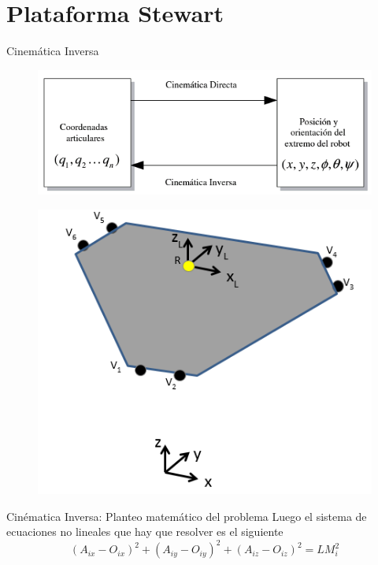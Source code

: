 \documentclass{beamer}
\begin{document}
\section{Plataforma Stewart}
\begin{frame}{Cinemática Inversa}
\begin{figure}[h]
\centering
\includegraphics[scale=0.4]{cinematica}

\end{figure}
\begin{figure}[h]
\centering
\includegraphics[scale=0.35]{base_sup}

\end{figure}

\end{frame}


\begin{frame}{Cinématica Inversa: Planteo matemático del problema}
Luego el sistema de ecuaciones no lineales que hay que resolver es el siguiente
$$(A_{ix}-O_{ix})^{2}+(A_{iy}-O_{iy} )^{2}+(A_{iz}-O_{iz})^{2} = LM_{i}^{2}$$
\end{frame}
\end{document}
